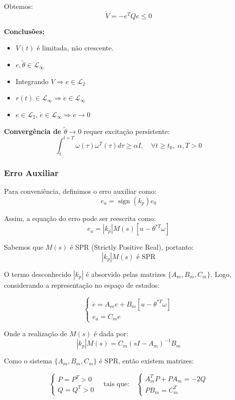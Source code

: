 \documentclass[10pt]{article}
\begin{document}
Obtemos:
\[
\dot{V} = -e^T Q e \leq 0
\]

\textbf{Conclusões:}
\begin{itemize}
    \item \( V(t) \) é limitada, não crescente.
    \item \( e, \tilde{\theta} \in \mathcal{L}_\infty \)
    \item Integrando \( \dot{V} \Rightarrow e \in \mathcal{L}_2 \)
    \item \( r(t) \in \mathcal{L}_{\infty} \Rightarrow \dot{e} \in \mathcal{L}_{\infty}\)
    \item \( e \in \mathcal{L}_2\), \( \dot{e} \in \mathcal{L}_\infty \Rightarrow e \to 0 \)
\end{itemize}

\textbf{Convergência de \( \tilde{\theta} \to 0 \)} requer excitação persistente:
\[
\int_t^{t+T} \omega(\tau) \omega^T(\tau) d\tau \geq \alpha I, \quad \forall t \geq t_0, \; \alpha, T > 0
\]

\subsubsection{Erro Auxiliar}

Para conveniência, definimos o erro auxiliar como:
\[
e_a = \operatorname{sign}(k_p) e_0
\]

Assim, a equação do erro pode ser reescrita como:
\[
e_a = |k_p| M(s) [u - \theta^{*T} \omega]
\]

Sabemos que $M(s)$ é SPR (Strictly Positive Real), portanto:
\[
|k_p| M(s)\text{ é SPR}
\]

O termo desconhecido $|k_p|$ é absorvido pelas matrizes $\{A_m, B_m, C_m\}$. Logo, considerando a representação no espaço de estados:

\[
\begin{cases}
\dot{e} = A_m e + B_m [u - \theta^{*T} \omega] \\
e_a = C_m e
\end{cases}
\]

Onde a realização de $M(s)$ é dada por:
\[
|k_p| M(s) = C_m (sI - A_m)^{-1} B_m
\]

Como o sistema $\{A_m, B_m, C_m\}$ é SPR, então existem matrizes:

\[
\begin{cases}
P = P^T > 0 \\
Q = Q^T > 0
\end{cases}
\quad \text{tais que:} \quad
\begin{cases}
A_m^T P + P A_m = -2Q \\
P B_m = C_m^T
\end{cases}
\]
\end{document}
